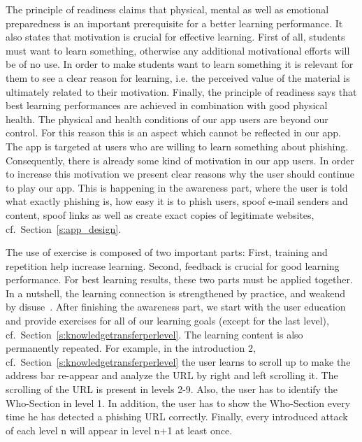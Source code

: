 \begin{description}[leftmargin=0cm]
	\item[Readiness] The principle of readiness claims that physical, mental as well as emotional preparedness is an important prerequisite for a better learning performance. 
It also states that motivation is crucial for effective learning. 
First of all, students must want to learn something, otherwise any additional motivational efforts will be of no use. 
In order to make students want to learn something it is relevant for them to see a clear reason for learning, i.e. the perceived value of the material is ultimately related to their motivation. 
Finally, the principle of readiness says that best learning performances are achieved in combination with good physical health.
The physical and health conditions of our app users are beyond our control.
For this reason this is an aspect which cannot be reflected in our app.
The app is targeted at users who are willing to learn something about phishing. 
Consequently, there is already some kind of motivation in our app users.
In order to increase this motivation we present clear reasons why the user should continue to play our app.
This is happening in the awareness part, where the user is told what exactly phishing is, how easy it is to phish users, spoof e-mail senders and content, spoof links as well as create exact copies of legitimate websites, cf.~Section~\ref{s:app_design}.
	\item[Exercise] The use of exercise is composed of two important parts: 
First, training and repetition help increase learning. 
Second, feedback is crucial for good learning performance.
For best learning results, these two parts must be applied together.
In a nutshell, the learning connection is strengthened by practice, and weakend by disuse~\cite{handbook2008us}.
After finishing the awareness part, we start with the user education and provide exercises for all of our learning goals (except for the last level), cf.~Section~\ref{s:knowledgetransferperlevel}.
The learning content is also permanently repeated. 
For example, in the introduction 2, cf.~Section~\ref{s:knowledgetransferperlevel} the user learns to scroll up to make the address bar re-appear and analyze the URL by right and left scrolling it. 
The scrolling of the URL is present in levels 2-9.
Also, the user has to identify the Who-Section in level 1. 
In addition, the user has to show the Who-Section every time he has detected a phishing URL correctly.
Finally, every introduced attack of each level n will appear in level n+1 at least once. 

\end{description}
